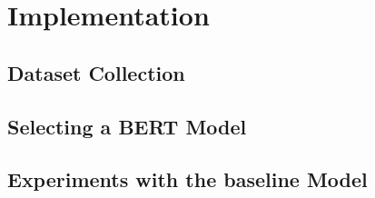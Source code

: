 
\chapter{Implementation} \label{chapter:implementation}

\section{Dataset Collection}
\section{Selecting a BERT Model}
\section{Experiments with the baseline Model}
